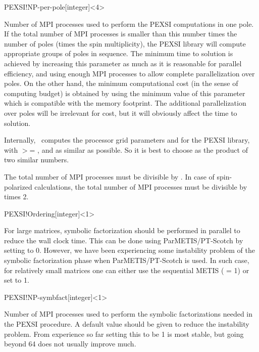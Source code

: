 \begin{fdfentry}{PEXSI!NP-per-pole}[integer]<4>

  Number of MPI processes used to perform the PEXSI computations in
  one pole. If the total number of MPI processes is smaller than this
  number times the number of poles (times the spin multiplicity), the
  PEXSI library will compute appropriate groups of poles in
  sequence. The minimum time to solution is achieved by increasing
  this parameter as much as it is reasonable for parallel efficiency,
  and using enough MPI processes to allow complete parallelization
  over poles. On the other hand, the minimum computational cost (in
  the sense of computing budget) is obtained by using the minimum
  value of this parameter which is compatible with the memory
  footprint. The additional parallelization over poles will be
  irrelevant for cost, but it will obviously affect the time to
  solution.

  Internally, \siesta\ computes the processor grid parameters
   and  for the PEXSI library, with
   $>$= , and as similar as possible. So it
  is best to choose  as the product of two
  similar numbers.
  
  \note The total number of MPI processes must be divisible by
  . In case of spin-polarized calculations, the
  total number of MPI processes must be divisible by
   times 2.

\end{fdfentry}

\begin{fdfentry}{PEXSI!Ordering}[integer]<1>

  For large matrices, symbolic factorization should be performed in
  parallel to reduce the wall clock time.  This can be done using
  ParMETIS/PT-Scotch by setting  to 0.  However,
  we have been experiencing some instability problem of the symbolic
  factorization phase when ParMETIS/PT-Scotch is used.  In such case,
  for relatively small matrices one can either use the sequential
  METIS ( = 1) or set  to
  1.
  
\end{fdfentry}


\begin{fdfentry}{PEXSI!NP-symbfact}[integer]<1>

  Number of MPI processes used to perform the symbolic factorizations
  needed in the PEXSI procedure.  A default value should be given to
  reduce the instability problem.  From experience so far setting this
  to be 1 is most stable, but going beyond 64 does not usually improve
  much.

\end{fdfentry}

